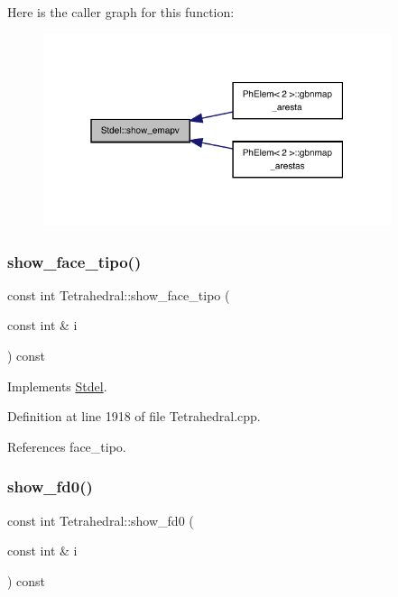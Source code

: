 Here is the caller graph for this function\+:
\nopagebreak
\begin{figure}[H]
\begin{center}
\leavevmode
\includegraphics[width=289pt]{classStdel_ad474ffc52b051ae8317b3fdb583c4c98_icgraph}
\end{center}
\end{figure}
\mbox{\label{classTetrahedral_a22f9442de50c6c994019935bb8011464}} 
\subsubsection{\texorpdfstring{show\+\_\+face\+\_\+tipo()}{show\_face\_tipo()}}
{\footnotesize\ttfamily const int Tetrahedral\+::show\+\_\+face\+\_\+tipo (\begin{DoxyParamCaption}\item[{const int \&}]{i }\end{DoxyParamCaption}) const\hspace{0.3cm}{\ttfamily [virtual]}}



Implements \hyperlink{classStdel_ae76b0893dabd93ae9f86a9ed445852ba}{Stdel}.



Definition at line 1918 of file Tetrahedral.\+cpp.



References face\+\_\+tipo.

\mbox{\label{classTetrahedral_abf123907219bb126731b6aae4bd3be11}} 
\subsubsection{\texorpdfstring{show\+\_\+fd0()}{show\_fd0()}}
{\footnotesize\ttfamily const int Tetrahedral\+::show\+\_\+fd0 (\begin{DoxyParamCaption}\item[{const int \&}]{i }\end{DoxyParamCaption}) const\hspace{0.3cm}{\ttfamily [virtual]}}



